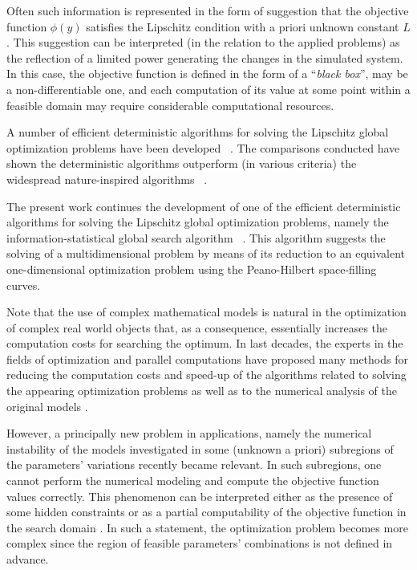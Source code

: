 \documentclass[runningheads]{llncs}
\begin{document}
Often such information is represented in the form of suggestion that the objective function $\phi(y)$ satisfies the Lipschitz condition with a priori unknown constant $L$.
This suggestion can be interpreted (in the relation to the applied problems) as the reflection of a limited power generating the changes in the simulated system. In this case, the objective function is defined in the form of a ``\textit{black box}'', may be a non-differentiable one, and each computation of its value at some point within a feasible domain may require considerable computational resources.

A number of efficient deterministic algorithms for solving the Lipschitz global optimization problems have been developed ~\cite{Grishagin2016_2,Jones2021,PaulaviciusZilinskas2014,Birect2020,Sergeyev2017}. The comparisons conducted have shown the deterministic algorithms outperform (in various criteria) the widespread nature-inspired algorithms ~\cite{Liberti2005,Sergeyev2018}.

The present work continues the development of one of the efficient deterministic algorithms for solving the Lipschitz global optimization problems, namely the information-statistical global search algorithm ~\cite{Sergeyev2013,Strongin2000}. This algorithm suggests the solving of a multidimensional problem by means of its reduction to an equivalent one-dimensional optimization problem using the Peano-Hilbert space-filling curves. 

Note that the use of complex mathematical models is natural in the optimization of complex real world objects that, as a consequence, essentially increases the computation costs for searching the optimum. In last decades, the experts in the fields of optimization and parallel computations have proposed many methods for reducing the computation costs and speed-up of the algorithms related to solving the appearing optimization problems \cite{Kvasov2013,Sergeyev2020} as well as to the numerical analysis of the original models \cite{Dongarra2022,Duwe2020}.

However, a principally new problem in applications, namely the numerical instability of the models investigated in some (unknown a priori) subregions of the parameters' variations recently became relevant. In such subregions, one cannot perform the numerical modeling and compute the objective function values correctly. This phenomenon can be interpreted either as the presence of some hidden constraints \cite{Stripinis2021} or as a partial computability of the objective function in the search domain \cite{Candelieri2019,Sergeyev2003,Strongin2020}. In such a statement, the optimization problem becomes more complex since the region of feasible parameters' combinations is not defined in advance.
\end{document}
